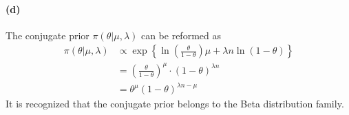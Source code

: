 \paragraph{(d)}
The conjugate prior $\pi(\theta \vert \mu, \lambda)$ can be reformed as
\begin{align*}
    \pi(\theta \vert \mu, \lambda)
    &\propto  \exp \left\{ \ln \left(\frac{\theta}{1-\theta}\right) \mu + \lambda n \ln (1-\theta) \right\}\\
    &= \left( \frac{\theta}{1-\theta} \right)^\mu \cdot (1-\theta)^{\lambda n}\\
    &= \theta^\mu (1-\theta)^{\lambda n - \mu}
\end{align*}
It is recognized that the conjugate prior belongs to the Beta distribution family.